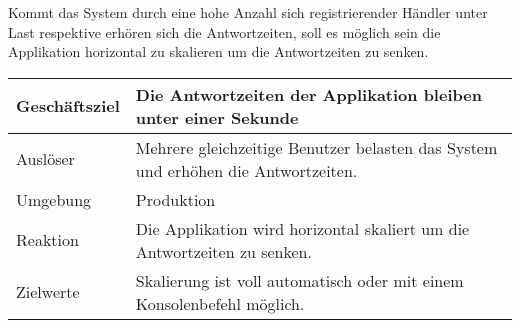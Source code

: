 Kommt das System durch eine hohe Anzahl sich registrierender Händler unter Last respektive erhören sich die Antwortzeiten, soll es möglich sein die Applikation horizontal zu skalieren um die Antwortzeiten zu senken.

\begin{table}[H]
	\centering
	\begin{tabular}{ | p{3cm} | p{12cm} | }
		\toprule
		Geschäftsziel & Die Antwortzeiten der Applikation bleiben unter einer Sekunde \\ \hline
		Auslöser & Mehrere gleichzeitige Benutzer belasten das System und erhöhen die Antwortzeiten. \\ \hline
		Umgebung & Produktion\\ \hline
		Reaktion & Die Applikation wird horizontal skaliert um die Antwortzeiten zu senken. \\ \hline
		Zielwerte & Skalierung ist voll automatisch oder mit einem Konsolenbefehl möglich. \\
		\bottomrule
	\end{tabular}
\end{table}
